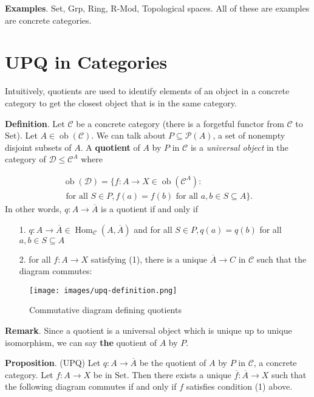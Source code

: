 \documentclass{memoir}
\begin{document}
\textbf{Examples}. Set, Grp, Ring, R-Mod, Topological spaces. All of these are examples are concrete categories.

\chapter{UPQ in Categories}

Intuitively, quotients are used to identify elements of an object in a concrete category to get the {\textquotedbl}closest{\textquotedbl} object that is in the same category.

\textbf{Definition}. Let \(\mathcal{C}\) be a concrete category (there is a forgetful functor from \(\mathcal{C}\) to \(\mathrm{Set}\)).  Let \(A \in \operatorname{ob}(\mathcal{C})\). We can talk about \(P \subseteq \mathcal{P}(A)\), a set of nonempty disjoint subsets of \(A\). A \textbf{quotient} of \(A\) by \(P\) in \(\mathcal{C}\) is a \emph{universal object} in the category of \(\mathcal{D} \leq \mathcal{C}^{A}\) where

\begin{equation*}
\begin{split}\operatorname{ob}(\mathcal{D}) = \{ f : A \to X \in \operatorname{ob}(\mathcal{C}^A) : \\
\text{ for all } S \in P, f(a) = f(b) \text{ for all } a,b \in S \subseteq A\}.\end{split}\end{equation*}
In other words, \(q : A \to \overline{A}\) is a quotient if and only if

\begin{itemize}
\item[1. ] \(q : A \to \overline{A} \in \operatorname{Hom}_{\mathcal{C}}(A,\overline{A})\) and for all \(S \in P, q(a) = q(b)\) for all \(a,b \in S \subseteq A\)
\item[2. ] for all \(f : A \to X\) satisfying (1), there is a unique \(\overline{A} \to C\) in \(\mathcal{C}\) such that the diagram commutes:

\end{itemize}
\begin{figure}
\centering
\texttt{[image: images/upq-definition.png]}
\caption{Commutative diagram defining quotients}
\end{figure}


\textbf{Remark}. Since a quotient is a universal object which is unique up to unique isomorphism, we can say \textbf{the} quotient of \(A\) by \(P\).

\textbf{Proposition}. (UPQ) Let \(q : A \to \overline{A}\) be the quotient of \(A\) by \(P\) in \(\mathcal{C}\), a concrete category. Let \(f : A \to X\) be in \(\mathrm{Set}\). Then there exists a unique \(\overline{f} : \overline{A} \to X\) such that the following diagram commutes if and only if \(f\) satisfies condition (1) above.
\end{document}
